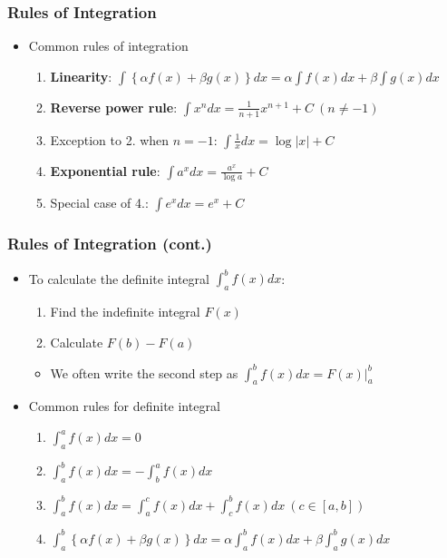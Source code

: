 \documentclass[pdflatex, 12pt]{beamer}
\begin{document}
\begin{frame}
\frametitle{Rules of Integration}
\begin{itemize}
\item Common rules of integration
 \begin{enumerate}
 \item \textbf{Linearity}: $\int \left\{\alpha f(x) + \beta g(x) \right\}dx = \alpha \int f(x)dx + \beta \int g(x)dx$
 \vspace{0.1cm}
 \item \textbf{Reverse power rule}: $\int x^n dx = \frac{1}{n + 1} x^{n + 1} + C \ (n \neq -1)$
 \vspace{0.1cm}
 \item Exception to 2. when $n = -1$: $\int \frac{1}{x} dx = \log |x| + C$
 \vspace{0.1cm}
 \item \textbf{Exponential rule}: $\int a^x dx = \frac{a^x}{\log a} + C$
 \vspace{0.1cm}
 \item Special case of 4.: $\int e^x dx = e^x + C$
 \end{enumerate}
\end{itemize}
\end{frame}

\begin{frame}
\frametitle{Rules of Integration (cont.)}
\begin{itemize}
\item To calculate the definite integral $\int^b_a f(x) dx$:
 \begin{enumerate}
 \item Find the indefinite integral $F(x)$
 \item Calculate $F(b) - F(a)$
 \end{enumerate}
 \begin{itemize}
 \item We often write the second step as $\int^b_a f(x) dx = F(x)\big|^b_a$
 \end{itemize}
\vspace{0.4cm}
\item Common rules for definite integral
 \begin{enumerate}
 \item $\int^a_a f(x) dx = 0$
 \item $\int^b_a f(x) dx = -\int^a_b f(x) dx$
 \item $\int^b_a f(x) dx = \int_a^c f(x) dx + \int^b_c f(x) dx \ (c \in [a, b])$
 \item $\int^b_a \left\{\alpha f(x) + \beta g(x)\right\} dx = \alpha \int^b_a f(x) dx + \beta \int^b_a g(x) dx$
 \end{enumerate}
\end{itemize}
\end{frame}
\end{document}
